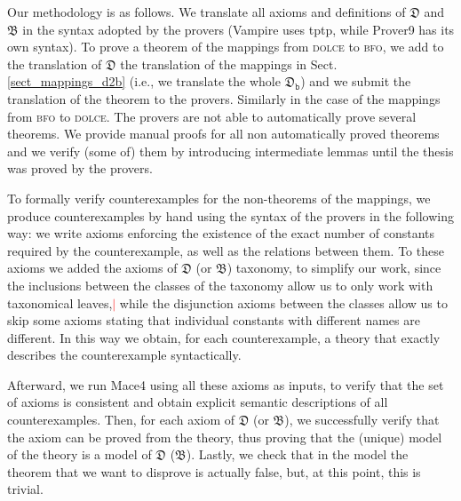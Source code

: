 \documentclass[ao]{iosart2x}
\newcommand{\nb}[1]{\textcolor{red}{$|$}\marginpar{\hspace*{-0cm}\parbox{20mm}{\scriptsize\raggedright\textcolor{red}{#1}}}}
\newcommand{\dolce}{{\textsc{dolce}}}
\newcommand{\bfo}{{\textsc{bfo}}}
\newcommand {\thdolce} {\ensuremath{\mathfrak{D}}}
\newcommand {\thbfo} {\ensuremath{\mathfrak{B}}}
\newcommand {\thdolcedbmap} {\ensuremath{\mathfrak{D}_\texttt{b}}}
\begin{document}
Our methodology is as follows. We translate all axioms and definitions of {$\thdolce$} and $\thbfo$ in the syntax adopted by the provers (Vampire uses tptp, while Prover9 has its own syntax).
  To prove a theorem of the mappings from {\dolce} to {\bfo}, we add to the translation of $\thdolce$ the translation of the mappings in Sect.\ref{sect_mappings_d2b} (i.e., we translate the whole $\thdolcedbmap$) and we submit the translation of the theorem to the provers. Similarly in the case of the mappings from {\bfo} to {\dolce}.
The provers are not able to automatically prove several theorems. We provide manual proofs for all non automatically proved theorems and we verify (some of) them by introducing intermediate lemmas until the thesis was proved by the provers. %

To formally verify counterexamples for the non-theorems of the mappings, we produce counterexamples by hand using the syntax of the provers in the following way: we write axioms enforcing the existence of the exact number of constants required by the counterexample, as well as the relations between them. To these axioms we added the axioms of {$\thdolce$} (or  {$\thbfo$}) taxonomy, to simplify our work, since the inclusions between the classes of the taxonomy allow us to only work with taxonomical leaves,\nb{CM: leggera modifica [FC: ok]} %
while the disjunction axioms between the classes allow us to skip some axioms stating that individual constants with different names are different. In this way we obtain, for each counterexample, a theory that exactly describes the counterexample syntactically.

Afterward, we run Mace4 using all these axioms as inputs, to verify that the set of axioms is consistent and obtain explicit semantic descriptions of all counterexamples. Then, for each axiom of {$\thdolce$} (or $\thbfo$), we successfully verify that the axiom can be proved from the theory, thus proving that the (unique) model of the theory is a model of {$\thdolce$} ($\thbfo$). 
Lastly, we check that in the model the theorem that we want to disprove is actually false, but, at this point, this is trivial.
\end{document}
